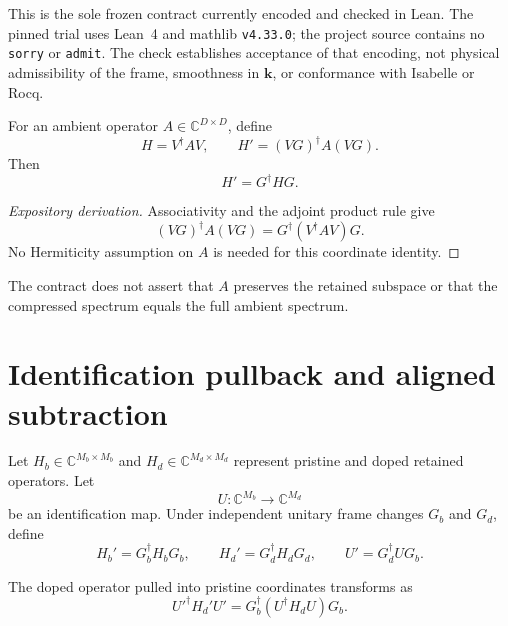 This is the sole frozen contract currently encoded and checked in Lean. The
pinned trial uses Lean~4 and mathlib \texttt{v4.33.0}; the project source contains
no \texttt{sorry} or \texttt{admit}. The check establishes acceptance of that
encoding, not physical admissibility of the frame, smoothness in $\mathbf k$,
or conformance with Isabelle or Rocq.

\begin{proposition}
\label{prop:compression-covariance}
For an ambient operator $A\in\mathbb C^{D\times D}$, define
\begin{equation}
  H=V^{\dagger}AV,
  \qquad
  H'=(VG)^{\dagger}A(VG).
\end{equation}
Then
\begin{equation}
  H'=G^{\dagger}HG.
\end{equation}
\end{proposition}

\begin{proof}[Expository derivation]
Associativity and the adjoint product rule give
\begin{equation}
  (VG)^{\dagger}A(VG)
  =G^{\dagger}(V^{\dagger}AV)G.
\end{equation}
No Hermiticity assumption on $A$ is needed for this coordinate identity.
\end{proof}

The contract does not assert that $A$ preserves the retained subspace or that
the compressed spectrum equals the full ambient spectrum.

\section{Identification pullback and aligned subtraction}

Let $H_b\in\mathbb C^{M_b\times M_b}$ and
$H_d\in\mathbb C^{M_d\times M_d}$ represent pristine and doped retained
operators. Let
\begin{equation}
  U:\mathbb C^{M_b}\longrightarrow\mathbb C^{M_d}
\end{equation}
be an identification map. Under independent unitary frame changes $G_b$ and
$G_d$, define
\begin{equation}
  H_b'=G_b^{\dagger}H_bG_b,
  \qquad
  H_d'=G_d^{\dagger}H_dG_d,
  \qquad
  U'=G_d^{\dagger}UG_b.
\end{equation}

\begin{proposition}
\label{prop:pullback-covariance}
The doped operator pulled into pristine coordinates transforms as
\begin{equation}
  U'^{\dagger}H_d'U'
  =
  G_b^{\dagger}(U^{\dagger}H_dU)G_b.
\end{equation}
\end{proposition}

